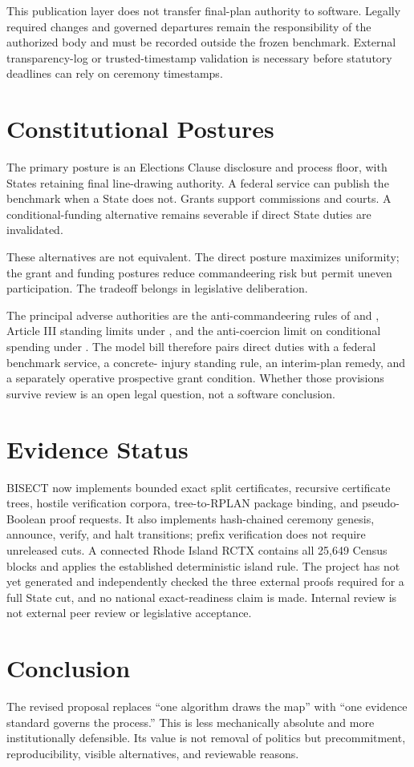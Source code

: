 This publication layer does not transfer final-plan authority to software.
Legally required changes and governed departures remain the responsibility of
the authorized body and must be recorded outside the frozen benchmark. External
transparency-log or trusted-timestamp validation is necessary before statutory
deadlines can rely on ceremony timestamps.

\section{Constitutional Postures}

The primary posture is an Elections Clause disclosure and process floor, with
States retaining final line-drawing authority. A federal service can publish
the benchmark when a State does not. Grants support commissions and courts. A
conditional-funding alternative remains severable if direct State duties are
invalidated.

These alternatives are not equivalent. The direct posture maximizes uniformity;
the grant and funding postures reduce commandeering risk but permit uneven
participation. The tradeoff belongs in legislative deliberation.

The principal adverse authorities are the anti-commandeering rules of
 and , Article III
standing limits under , and the anti-coercion
limit on conditional spending under . The model bill
therefore pairs direct duties with a federal benchmark service, a concrete-
injury standing rule, an interim-plan remedy, and a separately operative
prospective grant condition. Whether those provisions survive review is an
open legal question, not a software conclusion.

\section{Evidence Status}

BISECT now implements bounded exact split certificates, recursive certificate
trees, hostile verification corpora, tree-to-RPLAN package binding, and
pseudo-Boolean proof requests. It also implements hash-chained ceremony
genesis, announce, verify, and halt transitions; prefix verification does not
require unreleased cuts. A connected Rhode Island RCTX contains all
25,649 Census blocks and applies the established deterministic island rule.
The project has not yet generated and independently checked the three external
proofs required for a full State cut, and no national exact-readiness claim is
made. Internal review is not external peer review or legislative acceptance.

\section{Conclusion}

The revised proposal replaces ``one algorithm draws the map'' with ``one
evidence standard governs the process.'' This is less mechanically absolute
and more institutionally defensible. Its value is not removal of politics but
precommitment, reproducibility, visible alternatives, and reviewable reasons.
